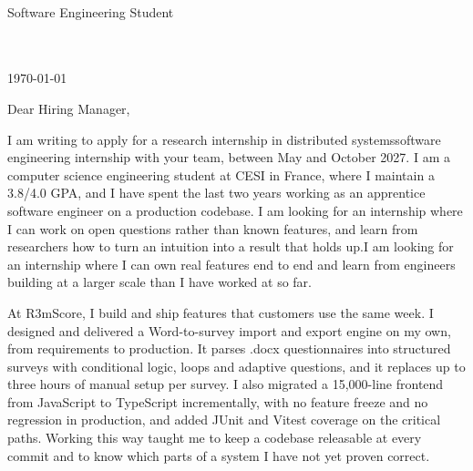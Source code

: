 \documentclass[a4paper,11pt]{article}
\begin{document}
\justifying
\setlength{\parindent}{1.4em}


{\huge\textcolor{colorName}{}} \\[4pt]
{\color{colorRole}Software Engineering Student} \\[8pt]
{\small\color{colorHeader}%
     \\[4pt]%
     \\[4pt]%
}

\vspace{1.6em}

\noindent\textcolor{colorBody}{\today}

\vspace{0.6em}


\noindent\textcolor{colorBody}{Dear Hiring Manager,}

\textcolor{colorBody}{I am writing to apply for a \ifdefined\researchVariant research internship in distributed systems\else software engineering internship\fi{} with your team, between May and October 2027. I am a computer science engineering student at CESI in France, where I maintain a 3.8/4.0 GPA, and I have spent the last two years working as an apprentice software engineer on a production codebase. \ifdefined\researchVariant I am looking for an internship where I can work on open questions rather than known features, and learn from researchers how to turn an intuition into a result that holds up.\else I am looking for an internship where I can own real features end to end and learn from engineers building at a larger scale than I have worked at so far.\fi}

\textcolor{colorBody}{At R3mScore, I build and ship features that customers use the same week. I designed and delivered a Word-to-survey import and export engine on my own, from requirements to production. It parses .docx questionnaires into structured surveys with conditional logic, loops and adaptive questions, and it replaces up to three hours of manual setup per survey. I also migrated a 15,000-line frontend from JavaScript to TypeScript incrementally, with no feature freeze and no regression in production, and added JUnit and Vitest coverage on the critical paths. Working this way taught me to keep a codebase releasable at every commit and to know which parts of a system I have not yet proven correct.}
\end{document}
